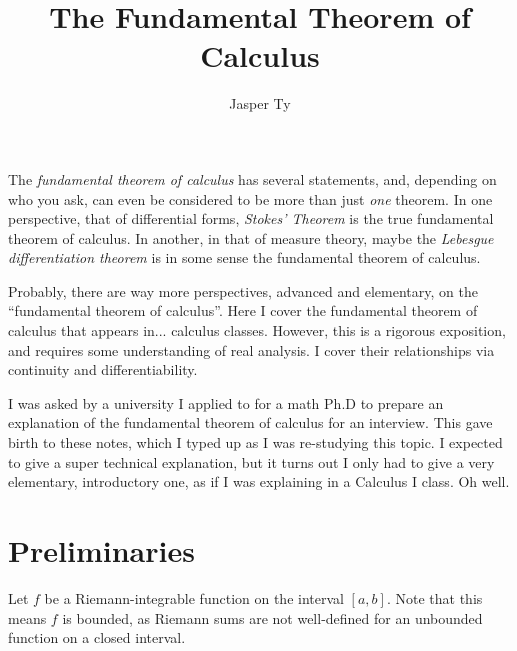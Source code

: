 \documentclass{article}
\title{The Fundamental Theorem of Calculus}
\author{Jasper Ty}
\date{}
\begin{document}
\maketitle 

The \emph{fundamental theorem of calculus} has several statements, and, depending on who you ask, can even be considered to be more than just \emph{one} theorem. 
In one perspective, that of differential forms, \emph{Stokes' Theorem} is the true fundamental theorem of calculus. 
In another, in that of measure theory, maybe the \emph{Lebesgue differentiation theorem} is in some sense the fundamental theorem of calculus. 

Probably, there are way more perspectives, advanced and elementary, on the ``fundamental theorem of calculus''. 
Here I cover the fundamental theorem of calculus that appears in... calculus classes. 
However, this is a rigorous exposition, and requires some understanding of real analysis. 
I cover their relationships via continuity and differentiability.

I was asked by a university I applied to for a math Ph.D to prepare an explanation of the fundamental theorem of calculus for an interview. 
This gave birth to these notes, which I typed up as I was re-studying this topic. 
I expected to give a super technical explanation, but it turns out I only had to give a very elementary, introductory one, as if I was explaining in a Calculus I class. 
Oh well.

\section*{Preliminaries}
Let $f$ be a Riemann-integrable function on the interval $[a, b]$.
Note that this means $f$ is bounded, as Riemann sums are not well-defined for an unbounded function on a closed interval.
\end{document}
